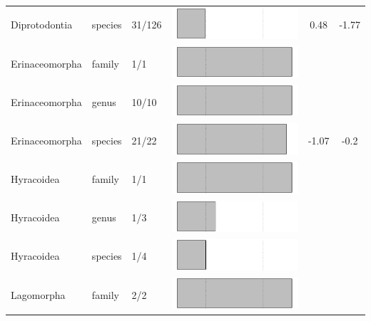 \begin{longtable}{lL{1.8cm}C{2cm}lcc}
  Diprotodontia & species & 31/126 & \includegraphics[width=0.20\linewidth, height=0.05\linewidth]{Supplementaries/Figures/Chapter2/Results_1c/Table_figures/bar27.pdf} & 0.48 & -1.77 \\ 
  Erinaceomorpha & family & 1/1 & \includegraphics[width=0.20\linewidth, height=0.05\linewidth]{Supplementaries/Figures/Chapter2/Results_1c/Table_figures/bar28.pdf} &   &   \\ 
  Erinaceomorpha & genus & 10/10 & \includegraphics[width=0.20\linewidth, height=0.05\linewidth]{Supplementaries/Figures/Chapter2/Results_1c/Table_figures/bar29.pdf} &   &   \\ 
  Erinaceomorpha & species & 21/22 & \includegraphics[width=0.20\linewidth, height=0.05\linewidth]{Supplementaries/Figures/Chapter2/Results_1c/Table_figures/bar30.pdf} & -1.07 & -0.2 \\ 
  Hyracoidea & family & 1/1 & \includegraphics[width=0.20\linewidth, height=0.05\linewidth]{Supplementaries/Figures/Chapter2/Results_1c/Table_figures/bar31.pdf} &   &   \\ 
  Hyracoidea & genus & 1/3 & \includegraphics[width=0.20\linewidth, height=0.05\linewidth]{Supplementaries/Figures/Chapter2/Results_1c/Table_figures/bar32.pdf} &   &   \\ 
  Hyracoidea & species & 1/4 & \includegraphics[width=0.20\linewidth, height=0.05\linewidth]{Supplementaries/Figures/Chapter2/Results_1c/Table_figures/bar33.pdf} &   &   \\ 
  Lagomorpha & family & 2/2 & \includegraphics[width=0.20\linewidth, height=0.05\linewidth]{Supplementaries/Figures/Chapter2/Results_1c/Table_figures/bar34.pdf} &   &   \\ 

\end{longtable}
